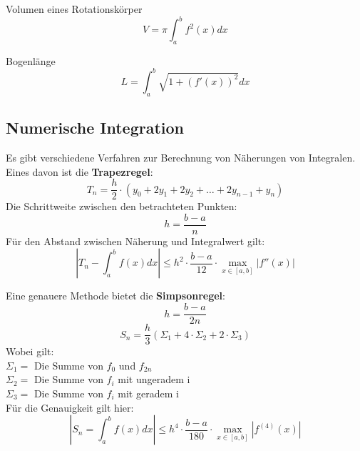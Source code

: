 \documentclass[german]{latex4ei/latex4ei_sheet}
\begin{document}
\begin{sectionbox}

\begin{cookbox}{Volumen eines Rotationskörper}
$$V = \pi\int_{a}^{b}f^2(x)dx$$
\end{cookbox}

\begin{cookbox}{Bogenlänge}
$$L = \int_{a}^{b}\sqrt{1+(f'(x))^2 } dx$$
\end{cookbox}

\subsection{Numerische Integration}
Es gibt verschiedene Verfahren zur Berechnung von Näherungen von Integralen. Eines davon ist die \textbf{Trapezregel}: 
$$T_n = \frac{h}{2}\cdot (y_0+2y_1+2y_2+ \dots + 2y_{n-1}+y_n)$$ 
Die Schrittweite zwischen den betrachteten Punkten: $$ h = \frac{b-a}{n}$$ 
Für den Abstand zwischen Näherung und Integralwert gilt: 
$$ | T_n - \int_{a}^{b}f(x) dx | \leq h^2 \cdot \frac{b-a}{12} \cdot \max_{x \in [a,b]}| f''(x) |
$$

Eine genauere Methode bietet die \textbf{Simpsonregel}: 
$$ h = \frac{b-a}{2n}$$ 
$$S_n = \frac{h}{3}(\Sigma_1 + 4 \cdot\Sigma_2 + 2 \cdot\Sigma_3 )$$
Wobei gilt: \\
$\Sigma_1 = $ Die Summe von $f_0$ und $f_{2n}$\\
$\Sigma_2 = $ Die Summe von $f_i$ mit ungeradem i\\
$\Sigma_3 = $ Die Summe von $f_i$ mit geradem i\\

Für die Genauigkeit gilt hier: 
$$ | S_n = \int_a^b f(x) dx | \leq h^4 \cdot \frac{b-a}{180} \cdot \max_{x \in [a,b] } | f^{(4)}(x)| $$ 


\end{sectionbox}
\end{document}
